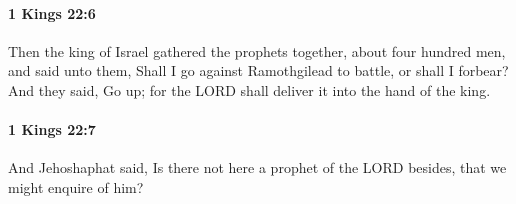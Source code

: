 		\paragraph{1 Kings 22:6} %
			\label{1KINGS-22-6}

			Then the king of Israel gathered the prophets together, about four hundred men, and said unto them, Shall I go against Ramothgilead to battle, or shall I forbear? And they said, Go up; for the LORD shall deliver it into the hand of the king.


		\paragraph{1 Kings 22:7} %
			\label{1KINGS-22-7}

			And Jehoshaphat said, Is there not here a prophet of the LORD besides, that we might enquire of him?


